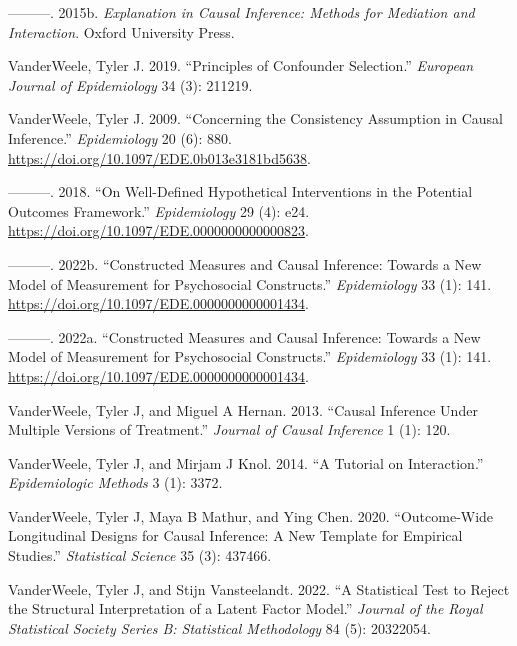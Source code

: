 \documentclass[
  singlecolumn]{report}
\newlength{\cslhangindent}
\newlength{\cslentryspacingunit} %
\newenvironment{CSLReferences}[2] %
 {%
  \setlength{\parindent}{0pt}
  \ifodd #1
  \let\oldpar\par
  \def\par{\hangindent=\cslhangindent\oldpar}
  \fi
  \setlength{\parskip}{#2\cslentryspacingunit}
 }%
 {}
\begin{document}
\begin{CSLReferences}{1}{0}
\leavevmode{}%
---------. 2015b. \emph{Explanation in Causal Inference: Methods for
Mediation and Interaction}. Oxford University Press.

\leavevmode{}%
VanderWeele, Tyler J. 2019. {``Principles of Confounder Selection.''}
\emph{European Journal of Epidemiology} 34 (3): 211219.

\leavevmode{}%
VanderWeele, Tyler J. 2009. {``Concerning the Consistency Assumption in
Causal Inference.''} \emph{Epidemiology} 20 (6): 880.
\url{https://doi.org/10.1097/EDE.0b013e3181bd5638}.

\leavevmode{}%
---------. 2018. {``On Well-Defined Hypothetical Interventions in the
Potential Outcomes Framework.''} \emph{Epidemiology} 29 (4): e24.
\url{https://doi.org/10.1097/EDE.0000000000000823}.

\leavevmode{}%
---------. 2022b. {``Constructed Measures and Causal Inference: Towards
a New Model of Measurement for Psychosocial Constructs.''}
\emph{Epidemiology} 33 (1): 141.
\url{https://doi.org/10.1097/EDE.0000000000001434}.

\leavevmode{}%
---------. 2022a. {``Constructed Measures and Causal Inference: Towards
a New Model of Measurement for Psychosocial Constructs.''}
\emph{Epidemiology} 33 (1): 141.
\url{https://doi.org/10.1097/EDE.0000000000001434}.

\leavevmode{}%
VanderWeele, Tyler J, and Miguel A Hernan. 2013. {``Causal Inference
Under Multiple Versions of Treatment.''} \emph{Journal of Causal
Inference} 1 (1): 120.

\leavevmode{}%
VanderWeele, Tyler J, and Mirjam J Knol. 2014. {``A Tutorial on
Interaction.''} \emph{Epidemiologic Methods} 3 (1): 3372.

\leavevmode{}%
VanderWeele, Tyler J, Maya B Mathur, and Ying Chen. 2020.
{``Outcome-Wide Longitudinal Designs for Causal Inference: A New
Template for Empirical Studies.''} \emph{Statistical Science} 35 (3):
437466.

\leavevmode{}%
VanderWeele, Tyler J, and Stijn Vansteelandt. 2022. {``A Statistical
Test to Reject the Structural Interpretation of a Latent Factor
Model.''} \emph{Journal of the Royal Statistical Society Series B:
Statistical Methodology} 84 (5): 20322054.


\end{CSLReferences}
\end{document}
